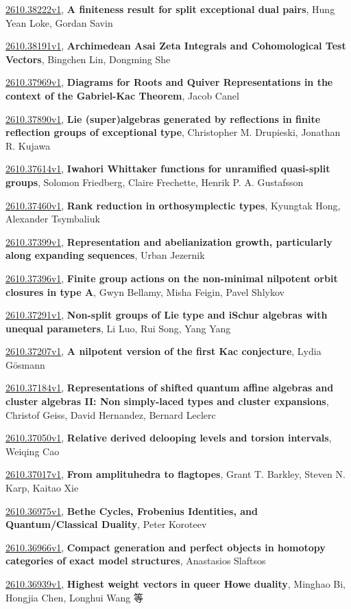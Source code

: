 \documentclass[9pt, a4paper]{article}
\theoremstyle{plain}
\theoremstyle{definition}
\theoremstyle{remark}
\newcommand{\arxiv}[3]{\href{https://arxiv.org/abs/#1}{#1}, \textbf{\textcolor{arxivblue}{#2}}, #3}
\begin{document}
\arxiv{2610.38222v1}{A finiteness result for split exceptional dual pairs}{Hung Yean Loke, Gordan Savin}

\arxiv{2610.38191v1}{Archimedean Asai Zeta Integrals and Cohomological Test Vectors}{Bingchen Lin, Dongming She}

\arxiv{2610.37969v1}{Diagrams for Roots and Quiver Representations in the context of the Gabriel-Kac Theorem}{Jacob Canel}

\arxiv{2610.37890v1}{Lie (super)algebras generated by reflections in finite reflection groups of exceptional type}{Christopher M. Drupieski, Jonathan R. Kujawa}

\arxiv{2610.37614v1}{Iwahori Whittaker functions for unramified quasi-split groups}{Solomon Friedberg, Claire Frechette, Henrik P. A. Gustafsson}

\arxiv{2610.37460v1}{Rank reduction in orthosymplectic types}{Kyungtak Hong, Alexander Tsymbaliuk}

\arxiv{2610.37399v1}{Representation and abelianization growth, particularly along expanding sequences}{Urban Jezernik}

\arxiv{2610.37396v1}{Finite group actions on the non-minimal nilpotent orbit closures in type A}{Gwyn Bellamy, Misha Feigin, Pavel Shlykov}

\arxiv{2610.37291v1}{Non-split groups of Lie type and iSchur algebras with unequal parameters}{Li Luo, Rui Song, Yang Yang}

\arxiv{2610.37207v1}{A nilpotent version of the first Kac conjecture}{Lydia Gösmann}

\arxiv{2610.37184v1}{Representations of shifted quantum affine algebras and cluster algebras II: Non simply-laced types and cluster expansions}{Christof Geiss, David Hernandez, Bernard Leclerc}

\arxiv{2610.37050v1}{Relative derived delooping levels and torsion intervals}{Weiqing Cao}

\arxiv{2610.37017v1}{From amplituhedra to flagtopes}{Grant T. Barkley, Steven N. Karp, Kaitao Xie}

\arxiv{2610.36975v1}{Bethe Cycles, Frobenius Identities, and Quantum/Classical Duality}{Peter Koroteev}

\arxiv{2610.36966v1}{Compact generation and perfect objects in homotopy categories of exact model structures}{Anastasios Slaftsos}

\arxiv{2610.36939v1}{Highest weight vectors in queer Howe duality}{Minghao Bi, Hongjia Chen, Longhui Wang 等}
\end{document}
